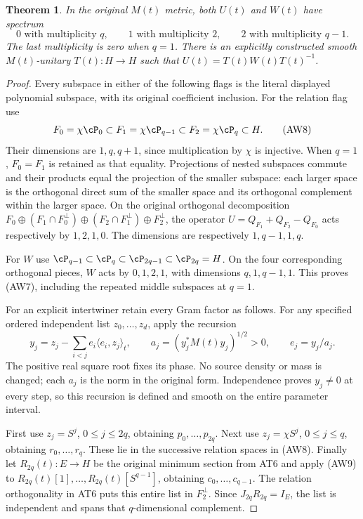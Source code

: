 \documentclass[10pt,a4paper,oneside]{report}
\newtheorem{theorem}{Theorem}[chapter]
\begin{document}
\begin{theorem}
In the original $M(t)$ metric, both $U(t)$ and $W(t)$ have spectrum
\[
 0\text{ with multiplicity }q,\qquad
 1\text{ with multiplicity }2,\qquad
 2\text{ with multiplicity }q-1.
 \tag{AW7}
\]
The last multiplicity is zero when $q=1$. There is an explicitly
constructed smooth $M(t)$-unitary $T(t):H\to H$ such that
$U(t)=T(t)W(t)T(t)^{-1}$.
\end{theorem}
\begin{proof}
Every subspace in either of the following flags is the literal
displayed polynomial subspace, with its original coefficient inclusion.
For the relation flag use
\[
 F_0=\chi\cP_0\subset F_1=\chi\cP_{q-1}
            \subset F_2=\chi\cP_q\subset H.
 \tag{AW8}
\]
Their dimensions are $1,q,q+1$, since multiplication by $\chi$ is
injective. When $q=1$, $F_0=F_1$ is retained as that equality.
Projections of nested subspaces commute and their products equal
the projection of the smaller subspace: each larger space is the
orthogonal direct sum of the smaller space and its orthogonal
complement within the larger space. On the original orthogonal
decomposition
$F_0\oplus(F_1\cap F_0^\perp)\oplus
(F_2\cap F_1^\perp)\oplus F_2^\perp$, the operator
$U=Q_{F_1}+Q_{F_2}-Q_{F_0}$ acts respectively by $1,2,1,0$.
The dimensions are respectively $1,q-1,1,q$.

For $W$ use
$\cP_{q-1}\subset\cP_q\subset\cP_{2q-1}\subset\cP_{2q}=H$.
On the four corresponding orthogonal pieces, $W$ acts by
$0,1,2,1$, with dimensions $q,1,q-1,1$. This proves (AW7),
including the repeated middle subspaces at $q=1$.

For an explicit intertwiner retain every Gram factor as follows.
For any specified ordered independent list $z_0,\ldots,z_d$,
apply the recursion
\[
 y_j=z_j-\sum_{i<j}e_i\langle e_i,z_j\rangle_t,
 \qquad a_j=(y_j^*M(t)y_j)^{1/2}>0,
 \qquad e_j=y_j/a_j.
 \tag{AW9}
\]
The positive real square root fixes its phase. No source density or
mass is changed; each $a_j$ is the norm in the original form.
Independence proves $y_j\ne0$ at every step, so this recursion is
defined and smooth on the entire parameter interval.

First use $z_j=S^j$, $0\le j\le2q$, obtaining $p_0,\ldots,p_{2q}$.
Next use $z_j=\chi S^j$, $0\le j\le q$, obtaining
$r_0,\ldots,r_q$. These lie in the successive relation spaces
in (AW8). Finally let $R_{2q}(t):E\to H$ be the original minimum
section from AT6 and apply (AW9) to
$R_{2q}(t)[1],\ldots,R_{2q}(t)[S^{q-1}]$, obtaining
$c_0,\ldots,c_{q-1}$. The relation orthogonality in AT6 puts this
entire list in $F_2^\perp$. Since $J_{2q}R_{2q}=I_E$, the list
is independent and spans that $q$-dimensional complement.


\end{proof}
\end{document}
